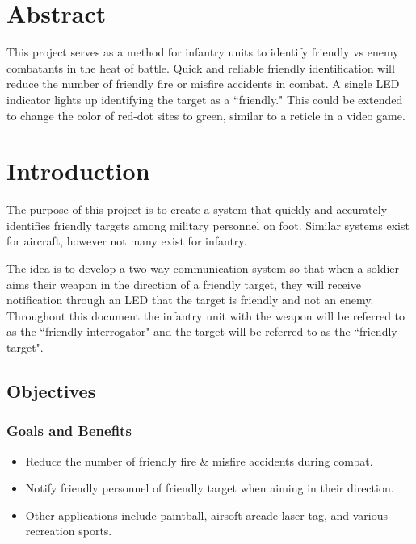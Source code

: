 \documentclass[letterpaper,10pt]{article}
\newcommand{\buildtoc}{
	\clearpage
	\singlespacing
	\tableofcontents
	\onehalfspacing
}
\begin{document}
\maketitle
\pagestyle{fancy}
\begin{spacing}{1.15}


\color{black}
\section*{Abstract}
This project serves as a method for infantry units to identify friendly vs enemy combatants in the heat of battle. Quick and reliable friendly identification will reduce the number of friendly fire or misfire accidents in combat. A single LED indicator lights up identifying the target as a ``friendly." This could be extended to change the color of red-dot sites to green, similar to a reticle in a video game. 
\buildtoc
{}
\clearpage
\setcounter{page}{1}

\section{Introduction}
The purpose of this project is to create a system that quickly and accurately identifies friendly targets among military personnel on foot. Similar systems exist for aircraft, however not many exist for infantry.

The idea is to develop a two-way communication system so that when a soldier aims their weapon in the direction of a friendly target, they will receive notification through an LED that the target is friendly and not an enemy. Throughout this document the infantry unit with the weapon will be referred to as the ``friendly interrogator" and the target will  be referred to as the ``friendly target". 

\subsection{Objectives}
\subsubsection{Goals and Benefits}
\begin{itemize}
	\item Reduce the number of friendly fire \& misfire accidents during combat.
	\item Notify friendly personnel of friendly target when aiming in their direction.
	\item Other applications include paintball, airsoft arcade laser tag, and various recreation sports.
\end{itemize}



\end{spacing}
\end{document}
